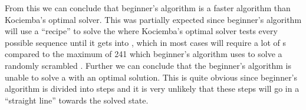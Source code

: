 From this we can conclude that beginner's algorithm is a faster algorithm than Kociemba's optimal solver.
This was partially expected since beginner's algorithm will use a ``recipe'' to solve the \rubik{} where Kociemba's optimal solver tests every possible \twist{} sequence until it gets into , which in most cases will require a lot of \twist{}s compared to the maximum of 241 which beginner's algorithm uses to solve a randomly scrambled \rubik{}.
Further we can conclude that the beginner's algorithm is unable to solve a \rubik{} with an optimal solution.
This is quite obvious since beginner's algorithm is divided into steps and it is very unlikely that these steps will go in a ``straight line'' towards the solved state.